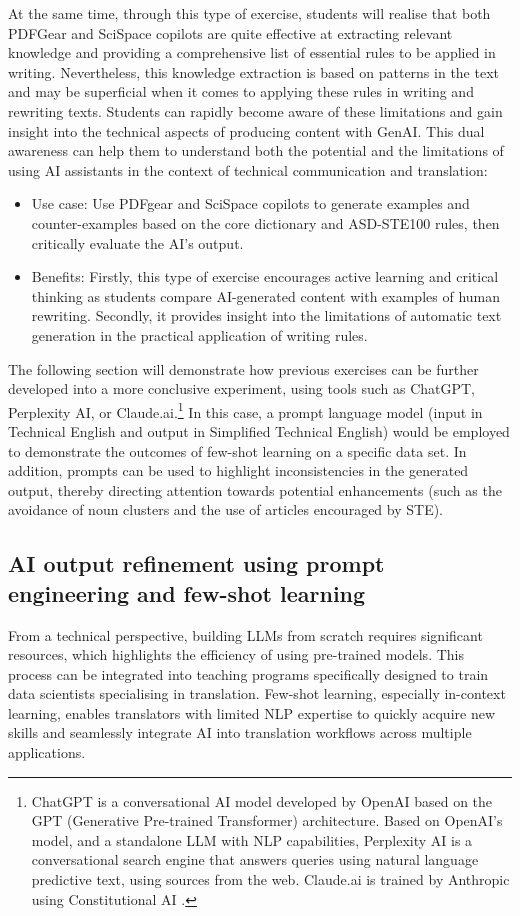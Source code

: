 \documentclass[output=paper]{langscibook}
\begin{document}
At the same time, through this type of exercise, students will realise that both PDFGear and SciSpace copilots are quite effective at extracting relevant knowledge and providing a comprehensive list of essential rules to be applied in writing. Nevertheless, this knowledge extraction is based on patterns in the text and may be superficial when it comes to applying these rules in writing and rewriting texts. Students can rapidly become aware of these limitations and gain insight into the technical aspects of producing content with GenAI. This dual awareness can help them to understand both the potential and the limitations of using AI assistants in the context of technical communication and translation:

\begin{itemize}
\item Use case: Use PDFgear and SciSpace copilots to generate examples and counter-examples based on the core dictionary and ASD-STE100 rules, then critically evaluate the AI’s output.
\item Benefits: Firstly, this type of exercise encourages active learning and critical thinking as students compare AI-generated content with examples of human rewriting. Secondly, it provides insight into the limitations of automatic text generation in the practical application of writing rules.
\end{itemize}
The following section will demonstrate how previous exercises can be further developed into a more conclusive experiment, using tools such as ChatGPT, Perplexity AI, or Claude.ai.\footnote{ChatGPT is a conversational AI model developed by OpenAI based on the GPT (Generative Pre-trained Transformer) architecture. Based on OpenAI's model, and a standalone LLM with NLP capabilities, Perplexity AI is a conversational search engine that answers queries using natural language predictive text, using sources from the web. Claude.ai is trained by Anthropic using Constitutional AI \citep{bai2022constitutionalaiharmlessnessai}.} In this case, a prompt language model (input in Technical English and output in Simplified Technical English) would be employed to demonstrate the outcomes of few-shot learning on a specific data set. In addition, prompts can be used to highlight inconsistencies in the generated output, thereby directing attention towards potential enhancements (such as the avoidance of noun clusters and the use of articles encouraged by STE).

\subsection{AI output refinement using prompt engineering and few-shot learning}
From a technical perspective, building LLMs from scratch requires significant resources, which highlights the efficiency of using pre-trained models. This process can be integrated into teaching programs specifically designed to train data scientists specialising in translation. Few-shot learning, especially in-context learning, enables translators with limited NLP expertise to quickly acquire new skills and seamlessly integrate AI into translation workflows across multiple applications.
\end{document}

